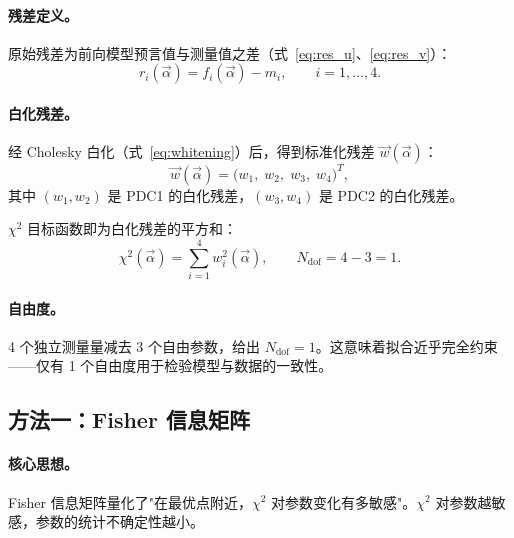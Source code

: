 \documentclass[a4paper, 11pt]{article}
\begin{document}
\paragraph{残差定义。}
原始残差为前向模型预言值与测量值之差（式~\eqref{eq:res_u}、\eqref{eq:res_v}）：
\begin{equation}
  r_i(\vec{\alpha}) = f_i(\vec{\alpha}) - m_i, \qquad i = 1, \dots, 4.
\end{equation}

\paragraph{白化残差。}
经 Cholesky 白化（式~\eqref{eq:whitening}）后，得到标准化残差 $\vec{w}(\vec{\alpha})$：
\begin{equation}
  \vec{w}(\vec{\alpha}) = \bigl(w_1,\; w_2,\; w_3,\; w_4\bigr)^T,
  \label{eq:whitened_residuals}
\end{equation}
其中 $(w_1, w_2)$ 是 PDC1 的白化残差，$(w_3, w_4)$ 是 PDC2 的白化残差。

$\chi^2$ 目标函数即为白化残差的平方和：
\begin{equation}
  \chi^2(\vec{\alpha}) = \sum_{i=1}^{4} w_i^2(\vec{\alpha}), \qquad N_\mathrm{dof} = 4 - 3 = 1.
  \label{eq:chi2_recall}
\end{equation}

\paragraph{自由度。} 4 个独立测量量减去 3 个自由参数，给出 $N_\mathrm{dof} = 1$。这意味着拟合近乎完全约束——仅有 1 个自由度用于检验模型与数据的一致性。

\subsection{方法一：Fisher 信息矩阵}
\label{sec:fisher}

\paragraph{核心思想。}
Fisher 信息矩阵量化了"在最优点附近，$\chi^2$ 对参数变化有多敏感"。$\chi^2$ 对参数越敏感，参数的统计不确定性越小。
\end{document}
